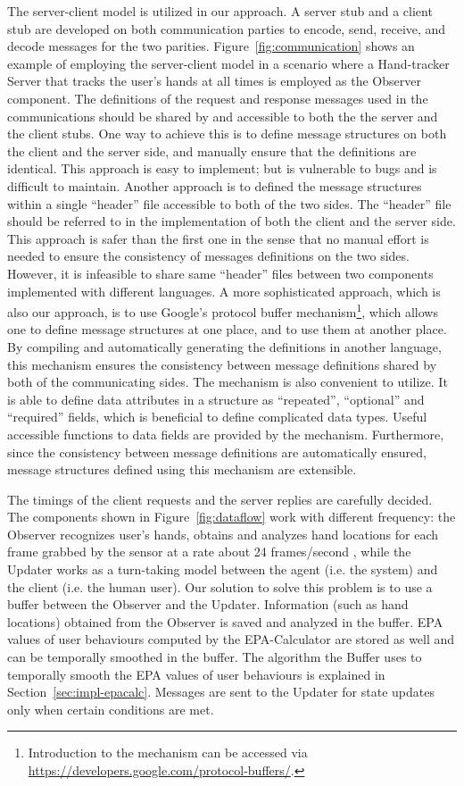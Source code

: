 The server-client model is utilized in our approach. A server stub and a client stub are developed on both communication parties to encode, send, receive, and decode messages for the two parities. Figure~\ref{fig:communication} shows an example of employing the server-client model in a scenario where a Hand-tracker Server that tracks the user's hands at all times is employed as the Observer component. The definitions of the request and response messages used in the communications should be shared by and accessible to both the  the server and the client stubs. One way to achieve this is to define message structures on both the client and the server side, and manually ensure that the definitions are identical. This approach is easy to implement; but is vulnerable to bugs and is difficult to maintain. Another approach is to defined the message structures within a single ``header'' file accessible to both of the two sides. The ``header'' file should be referred to in the implementation of both the client and the server side. This approach is safer than the first one in the sense that no manual effort is needed to ensure the consistency of messages definitions on the two sides. However, it is infeasible to share same ``header'' files between two components implemented with different languages. A more sophisticated approach, which is also our approach, is to use Google's protocol buffer mechanism\footnote{Introduction to the mechanism can be accessed via \url{https://developers.google.com/protocol-buffers/}.}, which allows one to define message structures at one place, and to use them at another place. By compiling and automatically generating the definitions in another language, this mechanism ensures the consistency between message definitions shared by both of the communicating sides. The mechanism is also convenient to utilize. It is able to define data attributes in a structure as ``repeated'', ``optional'' and ``required'' fields, which is beneficial to define complicated data types. Useful accessible functions to data fields are provided by the mechanism. Furthermore, since the consistency between message definitions are automatically ensured, message structures defined using this mechanism are extensible.

The timings of the client requests and the server replies are carefully decided. The components shown in Figure~\ref{fig:dataflow} work with different frequency: the Observer recognizes user's hands, obtains and analyzes hand locations for each frame grabbed by the sensor at a rate about 24 frames/second , while the Updater works as a turn-taking model between the agent (i.e. the system) and the client (i.e. the human user). Our solution to solve this problem is to use a buffer between the Observer and the Updater. Information (such as hand locations) obtained from the Observer is saved and analyzed in the buffer. EPA values of user behaviours computed by the EPA-Calculator are stored as well and can be temporally smoothed in the buffer. The algorithm the Buffer uses to temporally smooth the EPA values of user behaviours is explained in Section~\ref{sec:impl-epacalc}. Messages are sent to the Updater for state updates only when certain conditions are met. 

